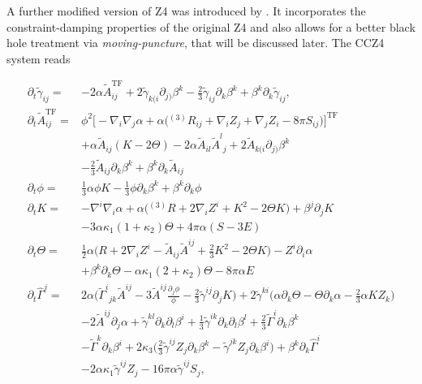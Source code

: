 A further modified version of Z4 was introduced by \cite{Alic:2011gg}. 
It incorporates the constraint-damping properties of the original Z4 and also allows for a better black hole treatment via \textit{moving-puncture}, that will be discussed later. 
The CCZ4 system reads 

\begin{align}
\partial_{t}\widetilde{\gamma}_{ij} = & -2\alpha\widetilde{A}_{ij}^{\text{TF}} + 2\widetilde{\gamma}_{k(i}\partial_{j)}\beta^k - \frac{2}{3}\widetilde{\gamma}_{ij}\partial_k \beta^k + \beta^k\partial_k\widetilde{\gamma}_{ij}, \\
\partial_{t}\widetilde{A}_{ij}^{\text{TF}} = & \phi^2\big[-\nabla_i\nabla_j\alpha + \alpha\big({^{(3)}R}_{ij}+\nabla_{i}Z_{j} + \nabla_{j}Z_{i}- 8\pi S_{ij}\big)\big]^{\text{TF}} \\
& + \alpha\widetilde{A}_{ij}(K-2\Theta)-2\alpha\widetilde{A}_{il}{\widetilde{A}^l}_{j} + 2\widetilde{A}_{k(i}\partial_{j)}\beta^{k} \\
& -\frac{2}{3}\widetilde{A}_{ij}\partial_{k}\beta^{k} + \beta^{k}\partial_{k}\widetilde{A}_{ij} \\
\partial_{t} \phi = & \frac{1}{3}\alpha\phi K - \frac{1}{3}\phi\partial_{k}\beta^{k} + \beta^{k}\partial_{k}\phi \\
\partial_{t}K = &-\nabla^{i}\nabla_{i}\alpha + \alpha\big({^{(3)}R} + 2\nabla_{i}Z^{i} + K^2 - 2\Theta K\big) + \beta^{j}\partial_{j}K \\
& - 3\alpha\kappa_1(1+\kappa_2)\Theta + 4\pi\alpha (S-3E) \\
\partial_{t}\Theta = &\frac{1}{2}\alpha\Big(R + 2\nabla_{i}Z^{i} - \widetilde{A}_{ij}\widetilde{A}^{ij} + \frac{2}{3}K^2 - 2\Theta K\Big) - Z^{i}\partial_{i}\alpha \\
& + \beta^{k}\partial_{k}\Theta - \alpha\kappa_1(2 + \kappa_2)\Theta - 8\pi\alpha E \\
\partial_{t}\hat{\Gamma}^j = & 2\alpha\Bigg({\widetilde{\Gamma}^i}_{jk}\widetilde{A}^{ij} - 	3\widetilde{A}^{ij}\frac{\partial_{j}\phi}{\phi} -\frac{2}{3}\widetilde{\gamma}^{ij}\partial_{j}K\Bigg) + 2\widetilde{\gamma}^{ki}\Big(\alpha\partial_{k}\Theta - \Theta\partial_{k}\alpha - \frac{2}{3}\alpha K Z_{k}\Big) \\
& - 2\widetilde{A}^{ij}\partial_{j}\alpha + \widetilde{\gamma}^{kl}\partial_{k}\partial_{l}\beta^{i} + \frac{1}{3} \widetilde{\gamma}^{ik}\partial_{k}\partial_{l}\beta^{l} + \frac{2}{3}\widetilde{\Gamma}^i\partial_{k}\beta^{k} \\
& - \widetilde{\Gamma}^k\partial_{k}\beta^{i} + 2\kappa_3\Big(\frac{2}{3}\widetilde{\gamma}^{ij}Z_{j}\partial_{k}\beta^{k} - \widetilde{\gamma}^{jk}Z_{j}\partial_{k}\beta^{i}\Big) + \beta^{k}\partial_{k}\hat{\Gamma}^i \\
& -2\alpha\kappa_1\widetilde{\gamma}^{ij}Z_{j}- 16\pi\alpha\widetilde{\gamma}^{ij}S_j,
\label{eq:theory:ccz4equations} %
\end{align}

